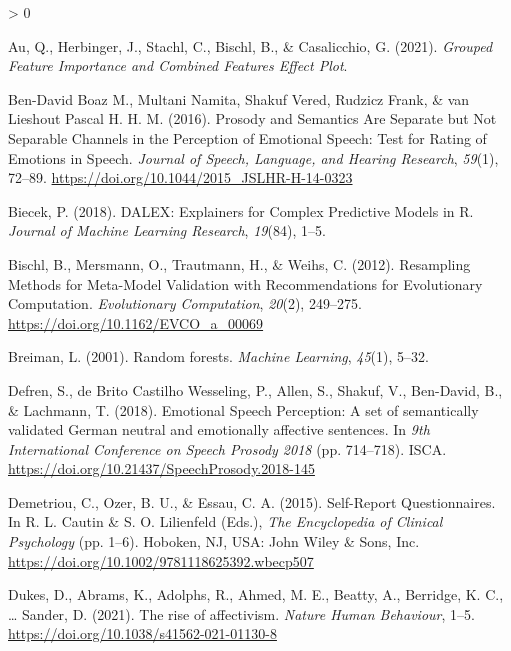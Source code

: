 \documentclass[
  english,
  man,floatsintext]{apa6}
\newlength{\cslhangindent}
\newenvironment{CSLReferences}[2] %
 {%
  \setlength{\parindent}{0pt}
  \ifodd #1 \everypar{\setlength{\hangindent}{\cslhangindent}}\ignorespaces\fi
  \ifnum #2 > 0
  \setlength{\parskip}{#2\baselineskip}
  \fi
 }%
 {}
\begin{document}
\hypertarget{refs}{}
\begin{CSLReferences}{1}{0}
\leavevmode\hypertarget{ref-auGroupedFeatureImportance2021}{}%
Au, Q., Herbinger, J., Stachl, C., Bischl, B., \& Casalicchio, G. (2021). \emph{Grouped {Feature Importance} and {Combined Features Effect Plot}}.

\leavevmode\hypertarget{ref-ben-davidboazm.ProsodySemanticsAre2016}{}%
Ben-David Boaz M., Multani Namita, Shakuf Vered, Rudzicz Frank, \& van Lieshout Pascal H. H. M. (2016). Prosody and {Semantics Are Separate} but {Not Separable Channels} in the {Perception} of {Emotional Speech}: Test for {Rating} of {Emotions} in {Speech}. \emph{Journal of Speech, Language, and Hearing Research}, \emph{59}(1), 72--89. \url{https://doi.org/10.1044/2015_JSLHR-H-14-0323}

\leavevmode\hypertarget{ref-biecekDALEXExplainersComplex2018}{}%
Biecek, P. (2018). {DALEX}: Explainers for {Complex Predictive Models} in {R}. \emph{Journal of Machine Learning Research}, \emph{19}(84), 1--5.

\leavevmode\hypertarget{ref-bischlResamplingMethodsMetaModel2012}{}%
Bischl, B., Mersmann, O., Trautmann, H., \& Weihs, C. (2012). Resampling {Methods} for {Meta}-{Model Validation} with {Recommendations} for {Evolutionary Computation}. \emph{Evolutionary Computation}, \emph{20}(2), 249--275. \url{https://doi.org/10.1162/EVCO_a_00069}

\leavevmode\hypertarget{ref-breimanRandomForests2001}{}%
Breiman, L. (2001). Random forests. \emph{Machine Learning}, \emph{45}(1), 5--32.

\leavevmode\hypertarget{ref-defrenEmotionalSpeechPerception2018}{}%
Defren, S., de Brito Castilho Wesseling, P., Allen, S., Shakuf, V., Ben-David, B., \& Lachmann, T. (2018). Emotional {Speech Perception}: A set of semantically validated {German} neutral and emotionally affective sentences. In \emph{9th {International Conference} on {Speech Prosody} 2018} (pp. 714--718). {ISCA}. \url{https://doi.org/10.21437/SpeechProsody.2018-145}

\leavevmode\hypertarget{ref-demetriouSelfReportQuestionnaires2015}{}%
Demetriou, C., Ozer, B. U., \& Essau, C. A. (2015). Self-{Report Questionnaires}. In R. L. Cautin \& S. O. Lilienfeld (Eds.), \emph{The {Encyclopedia} of {Clinical Psychology}} (pp. 1--6). {Hoboken, NJ, USA}: {John Wiley \& Sons, Inc.} \url{https://doi.org/10.1002/9781118625392.wbecp507}

\leavevmode\hypertarget{ref-dukesRiseAffectivism2021}{}%
Dukes, D., Abrams, K., Adolphs, R., Ahmed, M. E., Beatty, A., Berridge, K. C., \ldots{} Sander, D. (2021). The rise of affectivism. \emph{Nature Human Behaviour}, 1--5. \url{https://doi.org/10.1038/s41562-021-01130-8}


\end{CSLReferences}
\end{document}
